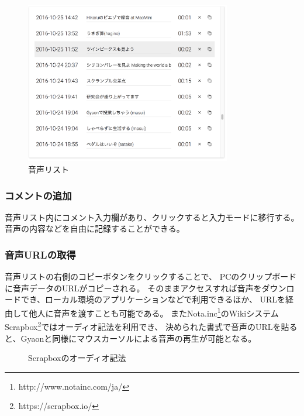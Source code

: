 \begin{figure}[H]
\centering
\includegraphics[width=9cm]{images/list.png}
\caption{音声リスト}
\label{list}
\end{figure}

\subsubsection{コメントの追加}
音声リスト内にコメント入力欄があり、クリックすると入力モードに移行する。
音声の内容などを自由に記録することができる。

\subsubsection{音声URLの取得}
音声リストの右側のコピーボタンをクリックすることで、
PCのクリップボードに音声データのURLがコピーされる。
そのままアクセスすれば音声をダウンロードでき、ローカル環境のアプリケーションなどで利用できるほか、
URLを経由して他人に音声を渡すことも可能である。
またNota.inc\footnote{\textsf{http://www.notainc.com/ja/}}のWikiシステム
Scrapbox\footnote{\textsf{https://scrapbox.io/}}ではオーディオ記法を利用でき、
決められた書式で音声のURLを貼ると、Gyaonと同様にマウスカーソルによる音声の再生が可能となる。

\begin{figure}[H]
\centering
{}
\caption{Scrapboxのオーディオ記法}
\label{scrapbox}
\end{figure}

